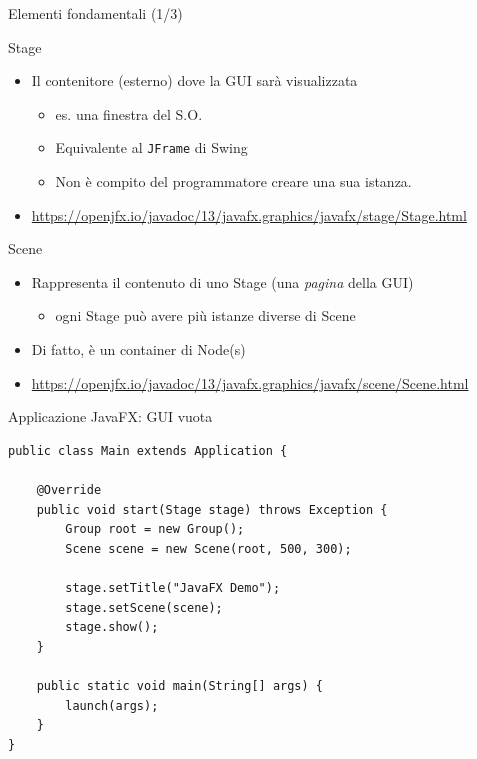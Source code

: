 \documentclass[presentation]{beamer}
\begin{document}
\begin{frame}{Elementi fondamentali (1/3)}
\begin{block}{Stage}
\begin{itemize}
\item Il contenitore (esterno) dove la GUI sarà visualizzata
\begin{itemize}
\item es. una finestra del S.O.
\item Equivalente al \texttt{JFrame} di Swing
\item Non è compito del programmatore creare una sua istanza.
\end{itemize}
\item \url{https://openjfx.io/javadoc/13/javafx.graphics/javafx/stage/Stage.html}
\end{itemize}
\end{block}

\begin{block}{Scene}
\begin{itemize}
\item Rappresenta il contenuto di uno Stage (una \emph{pagina} della GUI)
\begin{itemize}
\item ogni Stage può avere più istanze diverse di Scene
\end{itemize}
\item Di fatto, è un container di Node(s)
\item \url{https://openjfx.io/javadoc/13/javafx.graphics/javafx/scene/Scene.html}
\end{itemize}
\end{block}
\end{frame}

\begin{frame}[fragile]{Applicazione JavaFX: GUI vuota}
\begin{lstlisting}
public class Main extends Application {

	@Override
	public void start(Stage stage) throws Exception {
		Group root = new Group();
		Scene scene = new Scene(root, 500, 300);
		
		stage.setTitle("JavaFX Demo");
		stage.setScene(scene);
		stage.show();
	}
	
	public static void main(String[] args) {
		launch(args);
	}
}
\end{lstlisting}
\end{frame}
\end{document}

